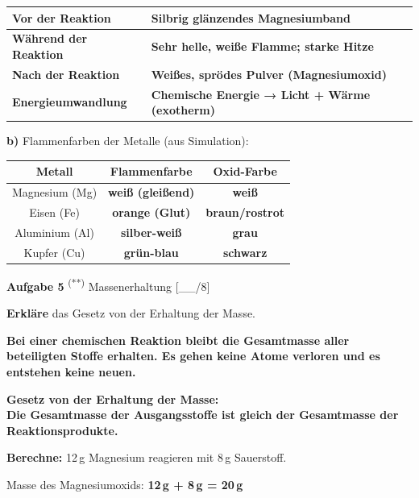 \documentclass[11pt, a4paper]{article}
\newif\ifzeigesternchen\zeigesternchentrue
\newcommand{\lsg}[1]{\textcolor{loesung}{\textbf{#1}}}  %
\newcommand{\punktebox}[1]{\hfill\small\textcolor{mittelgrau}{[\_\_/#1]}}
\newcommand{\stern}[1]{%
    \ifzeigesternchen%
        \textsuperscript{\textcolor{fachfarbe}{(#1)}}%
    \fi%
}
\newcommand{\aufgabe}[2]{%
    \needspace{4\baselineskip}%
    \vspace{10pt}%
    \noindent\textbf{\textcolor{fachfarbe}{Aufgabe #1}} #2%
    \vspace{4pt}%
    \nopagebreak[4]%
}
\newcommand{\operator}[1]{\textbf{\textcolor{fachfarbe}{#1}}}
\begin{document}
\begin{center}
\begin{tabular}{|p{4cm}|p{9cm}|}
\hline
\textbf{Vor der Reaktion} & \lsg{Silbrig glänzendes Magnesiumband} \\
\hline
\textbf{Während der Reaktion} & \lsg{Sehr helle, weiße Flamme; starke Hitze} \\
\hline
\textbf{Nach der Reaktion} & \lsg{Weißes, sprödes Pulver (Magnesiumoxid)} \\
\hline
\textbf{Energieumwandlung} & \lsg{Chemische Energie → Licht + Wärme (exotherm)} \\
\hline
\end{tabular}
\end{center}

\vspace{0.3em}

\textbf{b)} Flammenfarben der Metalle (aus Simulation):

\begin{center}
\begin{tabular}{|c|c|c|}
\hline
\textbf{Metall} & \textbf{Flammenfarbe} & \textbf{Oxid-Farbe} \\
\hline
Magnesium (Mg) & \lsg{weiß (gleißend)} & \lsg{weiß} \\
\hline
Eisen (Fe) & \lsg{orange (Glut)} & \lsg{braun/rostrot} \\
\hline
Aluminium (Al) & \lsg{silber-weiß} & \lsg{grau} \\
\hline
Kupfer (Cu) & \lsg{grün-blau} & \lsg{schwarz} \\
\hline
\end{tabular}
\end{center}


\aufgabe{5}{\stern{**} Massenerhaltung} \punktebox{8}

\begin{teil}
    \item \operator{Erkläre} das Gesetz von der Erhaltung der Masse.

    \lsg{Bei einer chemischen Reaktion bleibt die Gesamtmasse aller beteiligten Stoffe erhalten. Es gehen keine Atome verloren und es entstehen keine neuen.}

    \begin{formelkasten}
    \textbf{Gesetz von der Erhaltung der Masse:}\\[0.3em]
    \lsg{Die Gesamtmasse der Ausgangsstoffe ist gleich der Gesamtmasse der Reaktionsprodukte.}
    \end{formelkasten}

    \item \operator{Berechne:} 12\,g Magnesium reagieren mit 8\,g Sauerstoff.

    Masse des Magnesiumoxids: \lsg{12\,g + 8\,g = \textbf{20\,g}}
\end{teil}
\end{document}
